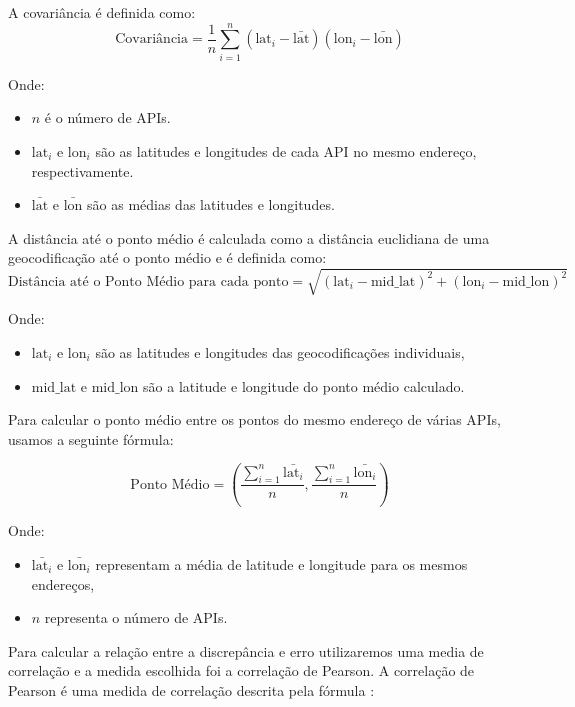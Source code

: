 A covariância é definida como:
\begin{equation}
   \text{Covariância} = \frac{1}{n}\sum_{i=1}^{n}(\text{lat}_i - \bar{\text{lat}})(\text{lon}_i - \bar{\text{lon}}) 
\end{equation}

Onde:
\begin{itemize}
    \item $n$ é o número de APIs.
    \item $\text{lat}_i$ e $\text{lon}_i$ são as latitudes e longitudes de cada API no mesmo endereço, respectivamente.
    \item $\bar{\text{lat}}$ e $\bar{\text{lon}}$ são as médias das latitudes e longitudes.
\end{itemize}

A distância até o ponto médio é calculada como a distância euclidiana de uma geocodificação até o ponto médio e é definida como:
\begin{equation}
    \text{Distância até o Ponto Médio para cada ponto} = \sqrt{(\text{lat}_i - \text{mid\_lat})^2 + (\text{lon}_i - \text{mid\_lon})^2}
\end{equation}

Onde:
\begin{itemize}
    \item $\text{lat}_i$ e $\text{lon}_i$ são as latitudes e longitudes das geocodificações individuais,
    \item $\text{mid\_lat}$ e $\text{mid\_lon}$ são a latitude e longitude do ponto médio calculado.
\end{itemize}

Para calcular o ponto médio entre os pontos do mesmo endereço de várias APIs, usamos a seguinte fórmula:

\begin{equation}
    \text{Ponto Médio} = \left(\frac{{\sum_{i=1}^{n} \bar{\text{lat}_i}}}{n}, \frac{{\sum_{i=1}^{n} \bar{\text{lon}_i}}}{n}\right)
\end{equation}

Onde:
\begin{itemize}
    \item $\bar{\text{lat}_i}$ e $\bar{\text{lon}_i}$ representam a média de latitude e longitude para os mesmos endereços,
    \item $n$ representa o número de APIs.
\end{itemize}

Para calcular a relação entre a discrepância e erro utilizaremos uma media de correlação e a medida escolhida foi a correlação de Pearson. A correlação de Pearson é uma medida de correlação descrita pela fórmula \cite{callegari2007}:

